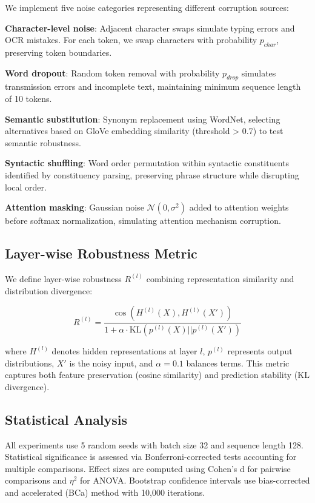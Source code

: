 \documentclass{article}
\begin{document}
We implement five noise categories representing different corruption sources:

\textbf{Character-level noise}: Adjacent character swaps simulate typing errors and OCR mistakes. For each token, we swap characters with probability $p_{char}$, preserving token boundaries.

\textbf{Word dropout}: Random token removal with probability $p_{drop}$ simulates transmission errors and incomplete text, maintaining minimum sequence length of 10 tokens.

\textbf{Semantic substitution}: Synonym replacement using WordNet, selecting alternatives based on GloVe embedding similarity (threshold > 0.7) to test semantic robustness.

\textbf{Syntactic shuffling}: Word order permutation within syntactic constituents identified by constituency parsing, preserving phrase structure while disrupting local order.

\textbf{Attention masking}: Gaussian noise $\mathcal{N}(0, \sigma^2)$ added to attention weights before softmax normalization, simulating attention mechanism corruption.

\subsection{Layer-wise Robustness Metric}

We define layer-wise robustness $R^{(l)}$ combining representation similarity and distribution divergence:

\begin{equation}
R^{(l)} = \frac{\cos(H^{(l)}(X), H^{(l)}(X'))}{1 + \alpha \cdot \text{KL}(p^{(l)}(X)||p^{(l)}(X'))}
\label{eq:robustness}
\end{equation}

where $H^{(l)}$ denotes hidden representations at layer $l$, $p^{(l)}$ represents output distributions, $X'$ is the noisy input, and $\alpha=0.1$ balances terms. This metric captures both feature preservation (cosine similarity) and prediction stability (KL divergence).

\subsection{Statistical Analysis}

All experiments use 5 random seeds with batch size 32 and sequence length 128. Statistical significance is assessed via Bonferroni-corrected tests accounting for multiple comparisons. Effect sizes are computed using Cohen's d for pairwise comparisons and $\eta^2$ for ANOVA. Bootstrap confidence intervals use bias-corrected and accelerated (BCa) method with 10,000 iterations.
\end{document}
